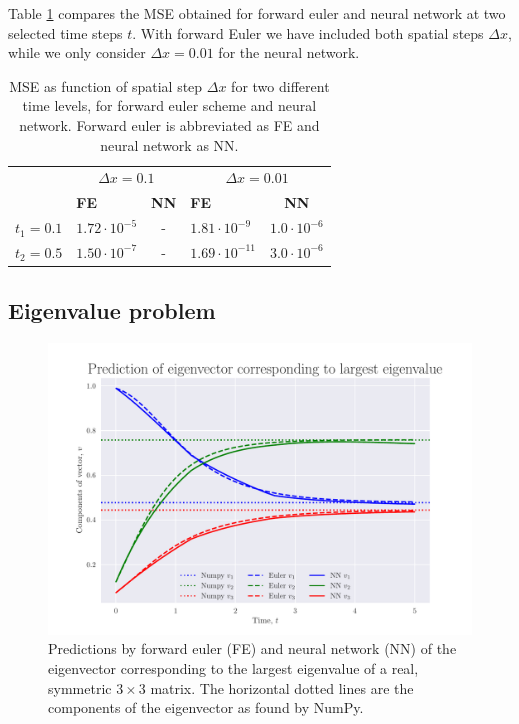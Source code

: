 \documentclass[12pt]{extarticle}
\begin{document}
Table \ref{tab:MSE_compare} compares the MSE obtained for forward euler and neural network at two selected time steps $t$. With forward Euler we have included both spatial steps $\Delta x$, while we only consider $\Delta x=0.01$ for the neural network. 

\begin{table}[h]
	\centering
	\begin{tabular}{l|cc|cc|}
		\cline{2-5}
		& \multicolumn{2}{c|}{\textbf{$\Delta x=0.1$}}           & \multicolumn{2}{c|}{\textbf{$\Delta x=0.01$}}           \\ \cline{2-5} 
		& \multicolumn{1}{l|}{\textbf{FE}}         & \textbf{NN} & \multicolumn{1}{l|}{\textbf{FE}}          & \textbf{NN} \\ \hline
		\multicolumn{1}{|l|}{\textbf{$t_1=0.1$}} & \multicolumn{1}{l|}{$1.72\cdot 10^{-5}$} & -            & \multicolumn{1}{l|}{$1.81\cdot 10^{-9}$}  & $1.0\cdot10^{-6}$            \\ \hline
		\multicolumn{1}{|l|}{\textbf{$t_2=0.5$}} & \multicolumn{1}{l|}{$1.50\cdot 10^{-7}$} & -            & \multicolumn{1}{l|}{$1.69\cdot 10^{-11}$} & $3.0\cdot10^{-6}$             \\ \hline
	\end{tabular}
\caption{MSE as function of spatial step $\Delta x$ for two different time levels, for forward euler scheme and neural network. Forward euler is abbreviated as FE and neural network as NN.}
\label{tab:MSE_compare}
\end{table}

\subsection{Eigenvalue problem}


\begin{figure}[h]
	\centering
	\includegraphics[scale=0.75]{../output/plots/eigvec_T5_N1000.pdf}
	\caption{Predictions by forward euler (FE) and neural network (NN) of the eigenvector corresponding to the largest eigenvalue of a real, symmetric $3\times 3$ matrix. The horizontal dotted lines are the components of the eigenvector as found by NumPy.}
	\label{fig:eigvec_T5_N1000}
\end{figure}
\end{document}
